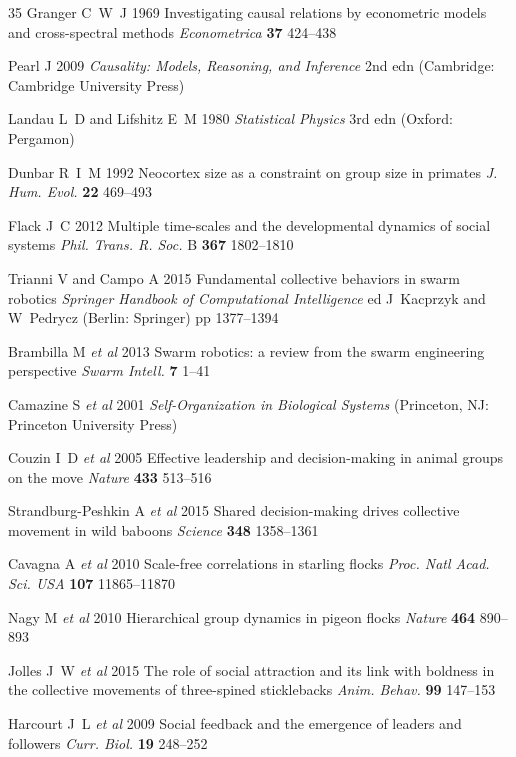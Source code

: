 \documentclass[12pt]{article}
\begin{document}
\begin{thebibliography}{35}
Granger C~W~J 1969 Investigating causal relations by econometric models and cross-spectral methods \emph{Econometrica} \textbf{37} 424--438

Pearl J 2009 \emph{Causality: Models, Reasoning, and Inference} 2nd edn (Cambridge: Cambridge University Press)

Landau L~D and Lifshitz E~M 1980 \emph{Statistical Physics} 3rd edn (Oxford: Pergamon)

Dunbar R~I~M 1992 Neocortex size as a constraint on group size in primates \emph{J. Hum. Evol.} \textbf{22} 469--493

Flack J~C 2012 Multiple time-scales and the developmental dynamics of social systems \emph{Phil. Trans. R. Soc.} B \textbf{367} 1802--1810

Trianni V and Campo A 2015 Fundamental collective behaviors in swarm robotics \emph{Springer Handbook of Computational Intelligence} ed J~Kacprzyk and W~Pedrycz (Berlin: Springer) pp 1377--1394

Brambilla M \emph{et al} 2013 Swarm robotics: a review from the swarm engineering perspective \emph{Swarm Intell.} \textbf{7} 1--41

Camazine S \emph{et al} 2001 \emph{Self-Organization in Biological Systems} (Princeton, NJ: Princeton University Press)

Couzin I~D \emph{et al} 2005 Effective leadership and decision-making in animal groups on the move \emph{Nature} \textbf{433} 513--516

Strandburg-Peshkin A \emph{et al} 2015 Shared decision-making drives collective movement in wild baboons \emph{Science} \textbf{348} 1358--1361

Cavagna A \emph{et al} 2010 Scale-free correlations in starling flocks \emph{Proc. Natl Acad. Sci. USA} \textbf{107} 11865--11870

Nagy M \emph{et al} 2010 Hierarchical group dynamics in pigeon flocks \emph{Nature} \textbf{464} 890--893

Jolles J~W \emph{et al} 2015 The role of social attraction and its link with boldness in the collective movements of three-spined sticklebacks \emph{Anim. Behav.} \textbf{99} 147--153

Harcourt J~L \emph{et al} 2009 Social feedback and the emergence of leaders and followers \emph{Curr. Biol.} \textbf{19} 248--252


\end{thebibliography}
\end{document}
